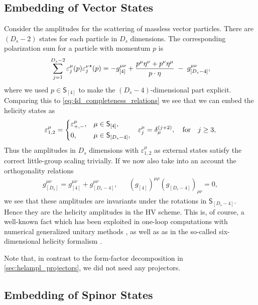 \subsection{Embedding of Vector States}
\label{sec:embedding_vectors}

Consider the amplitudes for the scattering of massless vector particles.
There are $(D_s - 2)$ states for each particle in $D_s$ dimensions. 
The corresponding polarization sum for a particle with momentum $p$ is 
\begin{equation}
  \sum_{j=1}^{D_s-2} \varepsilon^\mu_j(p){\varepsilon^\nu_j}^{\star{}}(p) = -g_{[4]}^{\mu\nu} + \frac{p^\mu \eta^\nu + p^\nu \eta^\mu}{\sp(p,\eta)} \;-\; g_{[D_s-4]}^{\mu\nu}, 
\end{equation}
where we used $p \in \mathsf{S}_{[4]}$
to make the $(D_s-4)$-dimensional part explicit.
Comparing this to \cref{eq:4d_completeness_relations} we see that we can embed the helicity states as
\begin{align}
  \varepsilon_{1,2}^\mu =
    \begin{dcases}
      \varepsilon^\mu_{+,-}, & \mu\in \mathsf{S}_{[4]},\\
      0, & \mu\in \mathsf{S}_{[D_s-4]},\\
    \end{dcases}
    &&
  \varepsilon_{j}^\mu = \delta^{(j+2)}_\mu, \qfor j\geq 3,
\end{align}
Thus the amplitudes in $D_s$ dimensions with $\varepsilon_{1,2}^\mu$ as external states satisfy the correct little-group scaling trivially.
If we now also take into an account the orthogonality relations 
\begin{align}
  g_{[D_s]}^{\mu\nu} = g^{\mu\nu}_{[4]}+g^{\mu\nu}_{[D_s-4]}, && (g_{[4]})^{\mu\rho}(g_{[D_s-4]})_{\rho\nu} = 0,
\end{align}
we see that these amplitudes are invariants under the rotations in $\mathsf{S}_{[D_s-4]}$.
Hence they are the helicity amplitudes in the HV scheme.
This is, of course, a well-known fact which has been exploited in one-loop computations with numerical generalized
unitary methods \cite{Ellis:2007br,Giele:2008ve}, as well as as 
in the so-called six-dimensional helicity formalism \cite{Bern2011,Cheung:2009dc,Badger:2013gxa,Badger:2017jhb}.

Note that, in contrast to the form-factor decomposition in \cref{sec:helampl_projectors}, we did not need any projectors.

\subsection{Embedding of Spinor States}
\label{sec:embedding_spinors}

